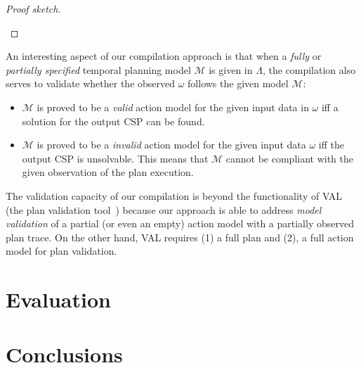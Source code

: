 \documentclass[letterpaper]{article} %
\begin{document}
\begin{proof}[Proof sketch]
\begin{small}
\end{small}
\end{proof}

An interesting aspect of our compilation approach is that when a {\em fully} or {\em partially specified} temporal planning model $\mathcal{M}$ is given in $\Lambda$, the compilation also serves to validate whether the observed $\omega$ follows the given model $\mathcal{M}$:

\begin{itemize}
	\item $\mathcal{M}$ is proved to be a {\em valid} action model for the given input data in $\omega$ iff a solution for the output CSP can be found.
	\item $\mathcal{M}$ is proved to be a {\em invalid} action model for the given input data $\omega$ iff the output CSP is unsolvable. This means that $\mathcal{M}$ cannot be compliant with the given observation of the plan execution.
\end{itemize}

The validation capacity of our compilation is beyond the functionality of VAL (the plan validation tool~\cite{howey2004val}) because our approach is able to address {\em model validation} of a partial (or even an empty) action model with a partially observed plan trace. On the other hand, VAL requires (1) a full plan and (2), a full action model for plan validation.


\section{Evaluation}
\label{sec:evaluation}

\section{Conclusions}
\label{sec:conclusions}



\end{document}
